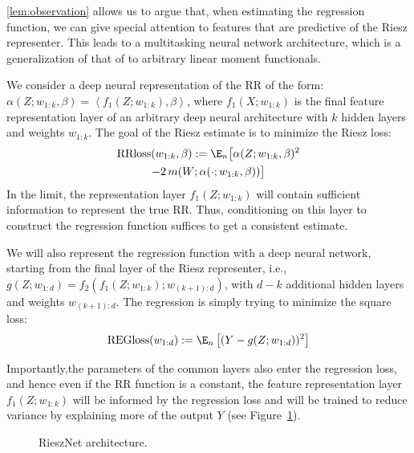 \documentclass[nohyperref]{article}
\newcommand{\ldot}[2]{\ensuremath{\left\langle #1, #2 \right\rangle}}
\newcommand{\rrloss}{\ensuremath{\mathrm{RRloss}}}
\newcommand{\regloss}{\ensuremath{\mathrm{REGloss}}}
\theoremstyle{plain}
\theoremstyle{definition}
\theoremstyle{remark}
\begin{document}
\cref{lem:observation} allows us to argue that, when estimating the regression function, we can give special attention to features that are predictive of the Riesz representer. This leads to a multitasking neural network architecture, which is a generalization of that of \citet{shi2019adapting} to arbitrary linear moment functionals. 

We consider a deep neural representation of the RR of the form: $\alpha(Z; w_{1:k}, \beta) = \ldot{f_1(Z; w_{1:k})}{\beta}$, where $f_1(X; w_{1:k})$ is the final feature representation layer of an arbitrary deep neural architecture with $k$ hidden layers and weights $w_{1:k}$. The goal of the Riesz estimate is to minimize the Riesz loss:
\begin{multline*}
    \rrloss(w_{1:k}, \beta) := \E_n\big[\alpha(Z; w_{1:k}, \beta)^2 \notag \\ -2\, m(W; \alpha(\cdot; w_{1:k}, \beta)) \big] 
\end{multline*}
In the limit, the representation layer $f_1(Z; w_{1:k})$ will contain sufficient information to represent the true RR. Thus, conditioning on this layer to construct the regression function suffices to get a consistent estimate. %

We will also represent the regression function with a deep neural network, starting from the final layer of the Riesz representer, i.e., $g(Z; w_{1:d}) = f_2(f_1(Z; w_{1:k}); w_{(k+1):d})$, with $d - k$ additional hidden layers and weights $w_{(k+1):d}$. The regression is simply trying to minimize the square loss:
\begin{align*}
    \regloss(w_{1:d}) := \E_n\left[(Y - g(Z; w_{1:d}))^2\right] 
\end{align*}

Importantly,the parameters of the common layers also enter the regression loss, and hence even if the RR function is a constant, the feature representation layer $f_1(Z; w_{1:k})$ will be informed by the regression loss and will be trained to reduce variance by explaining more of the output $Y$ (see Figure~\ref{fig:riesznet-arch}).

\begin{figure}[!htbp]
    \centering
    \resizebox{0.25\textwidth}{0.2\textwidth}{}
    \caption{RieszNet architecture.}
    \label{fig:riesznet-arch}
\end{figure}
\end{document}
